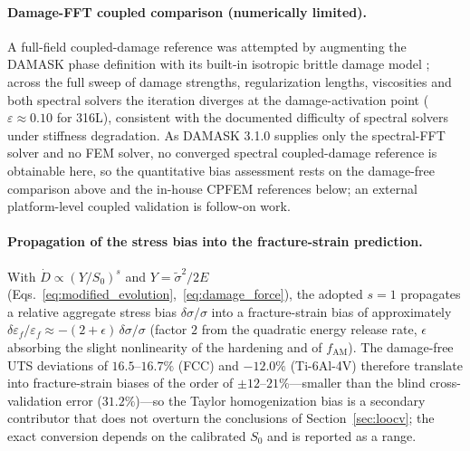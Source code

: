 \paragraph{Damage-FFT coupled comparison (numerically limited).} A full-field coupled-damage reference was attempted by augmenting the DAMASK phase definition with its built-in isotropic brittle damage model \cite{shanthraj2017phase}; across the full sweep of damage strengths, regularization lengths, viscosities and both spectral solvers the iteration diverges at the damage-activation point ($\varepsilon \approx 0.10$ for 316L), consistent with the documented difficulty of spectral solvers under stiffness degradation. As DAMASK 3.1.0 supplies only the spectral-FFT solver and no FEM solver, no converged spectral coupled-damage reference is obtainable here, so the quantitative bias assessment rests on the damage-free comparison above and the in-house CPFEM references below; an external platform-level coupled validation is follow-on work.

\paragraph{Propagation of the stress bias into the fracture-strain prediction.} With $\dot{D} \propto (Y/S_0)^s$ and $Y = \tilde{\sigma}^2/2E$ (Eqs.~\eqref{eq:modified_evolution},~\eqref{eq:damage_force}), the adopted $s=1$ propagates a relative aggregate stress bias $\delta\sigma/\sigma$ into a fracture-strain bias of approximately $\delta\varepsilon_f/\varepsilon_f \approx -(2+\epsilon)\,\delta\sigma/\sigma$ (factor $2$ from the quadratic energy release rate, $\epsilon$ absorbing the slight nonlinearity of the hardening and of $f_{\mathrm{AM}}$). The damage-free UTS deviations of $16.5$--$16.7\%$ (FCC) and $-12.0\%$ (Ti-6Al-4V) therefore translate into fracture-strain biases of the order of $\pm12$--$21\%$---smaller than the blind cross-validation error ($31.2\%$)---so the Taylor homogenization bias is a secondary contributor that does not overturn the conclusions of Section~\ref{sec:loocv}; the exact conversion depends on the calibrated $S_0$ and is reported as a range.


